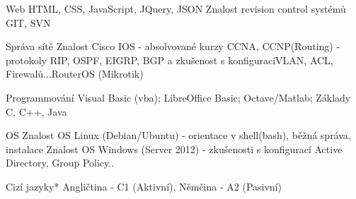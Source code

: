 

\begin{cvskills}

  
  \vspace{5pt}
  \cvskill
    {Web} %
    {HTML, CSS, JavaScript, JQuery, JSON \newline Znalost revision control systémů GIT, SVN}

  \vspace{5pt}
    
  \cvskill
    {Správa sítě} %
    {Znalost Cisco IOS - absolvované kurzy CCNA, CCNP(Routing) - protokoly RIP, OSPF, EIGRP, BGP a zkušenost s konfigurací\newline VLAN, ACL, Firewalů...\newline RouterOS (Mikrotik)} %
  \vspace{5pt}
  
  \cvskill
    {Programmování} %
    {Visual Basic (vba); LibreOffice Basic; Octave/Matlab; Základy C, C++, Java} %

  \vspace{5pt}
  \cvskill
    {OS}
    {Znalost OS Linux (Debian/Ubuntu) - orientace v shell(bash), běžná správa, instalace \newline Znalost OS Windows (Server 2012) - zkušenosti s konfigurací Active Directory, Group Policy..}
  \vspace{5pt}
    
  \cvskill
    {Cizí jazyky*} %
    {Angličtina - C1 (Aktivní), Němčina - A2 (Pasivní)} %

\end{cvskills}